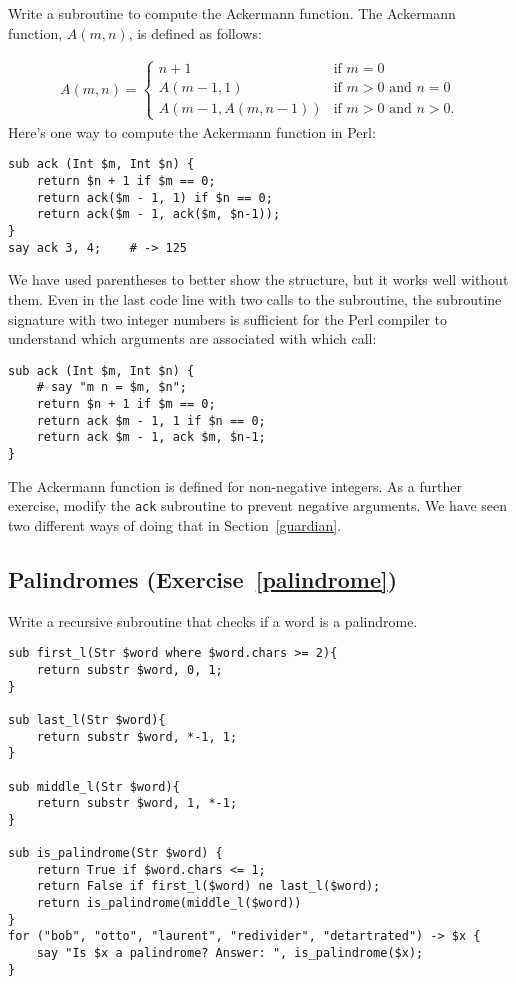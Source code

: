Write a subroutine to compute the Ackermann function. The Ackermann function, $A(m, n)$, is defined as follows:

\begin{eqnarray*}
A(m, n) = \begin{cases} 
              n+1 & \mbox{if } m = 0 \\ 
        A(m-1, 1) & \mbox{if } m > 0 \mbox{ and } n = 0 \\ 
A(m-1, A(m, n-1)) & \mbox{if } m > 0 \mbox{ and } n > 0.
\end{cases} 
\end{eqnarray*}
%
Here's one way to compute the Ackermann function in Perl:

\begin{verbatim}
sub ack (Int $m, Int $n) {
    return $n + 1 if $m == 0;
    return ack($m - 1, 1) if $n == 0;
    return ack($m - 1, ack($m, $n-1));
}
say ack 3, 4;    # -> 125
\end{verbatim}

We have used parentheses to better show the structure, but 
it works well without them. Even in the last code line with
two calls to the subroutine, the subroutine signature with 
two integer numbers is sufficient for the Perl compiler 
to understand which arguments are associated with which call:

\begin{verbatim}
sub ack (Int $m, Int $n) {
    # say "m n = $m, $n";
    return $n + 1 if $m == 0;
    return ack $m - 1, 1 if $n == 0;
    return ack $m - 1, ack $m, $n-1;
}
\end{verbatim}
%

The Ackermann function is defined for non-negative integers. 
As a further exercise, modify the {\tt ack} subroutine to 
prevent negative arguments. We have seen two different ways 
of doing that in Section~\ref{guardian}.


\subsection{Palindromes (Exercise~\ref{palindrome})}
\label{sol_palindrome}

Write a recursive subroutine that checks if a word is a 
palindrome.

\begin{verbatim}
sub first_l(Str $word where $word.chars >= 2){
    return substr $word, 0, 1;
}

sub last_l(Str $word){
    return substr $word, *-1, 1;
}

sub middle_l(Str $word){
    return substr $word, 1, *-1;
}

sub is_palindrome(Str $word) {
    return True if $word.chars <= 1;
    return False if first_l($word) ne last_l($word);
    return is_palindrome(middle_l($word))
}
for ("bob", "otto", "laurent", "redivider", "detartrated") -> $x {
    say "Is $x a palindrome? Answer: ", is_palindrome($x);
}
\end{verbatim}

